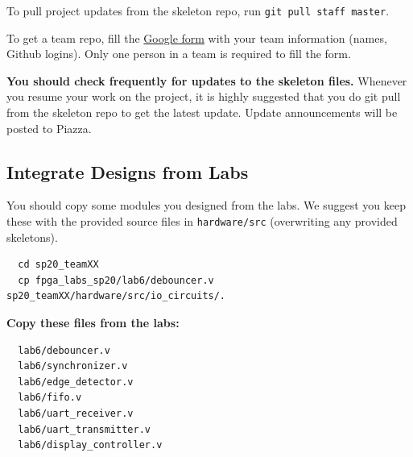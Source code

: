 \documentclass[11pt]{article}
\begin{document}
To pull project updates from the skeleton repo, run \verb|git pull staff master|.

To get a team repo, fill the \href{https://docs.google.com/forms/d/1oBUvG6DH-QeFeeiaRB2vwItycJ2V-RA0Zt5n1dMdOco}{Google form} with your team information (names, Github logins). Only one person in a team is required to fill the form.

\textbf{You should check frequently for updates to the skeleton files.} Whenever you resume your work on the project,
it is highly suggested that you do git pull from the skeleton repo to get the latest update.
Update announcements will be posted to Piazza.

\subsection{Integrate Designs from Labs} \label{past_designs}
You should copy some modules you designed from the labs.
We suggest you keep these with the provided source files in \verb|hardware/src| (overwriting any provided skeletons).

\begin{verbatim}
  cd sp20_teamXX
  cp fpga_labs_sp20/lab6/debouncer.v sp20_teamXX/hardware/src/io_circuits/.
\end{verbatim}

\textbf{Copy these files from the labs:}
\begin{verbatim}
  lab6/debouncer.v
  lab6/synchronizer.v
  lab6/edge_detector.v
  lab6/fifo.v
  lab6/uart_receiver.v
  lab6/uart_transmitter.v
  lab6/display_controller.v
\end{verbatim}
\end{document}
